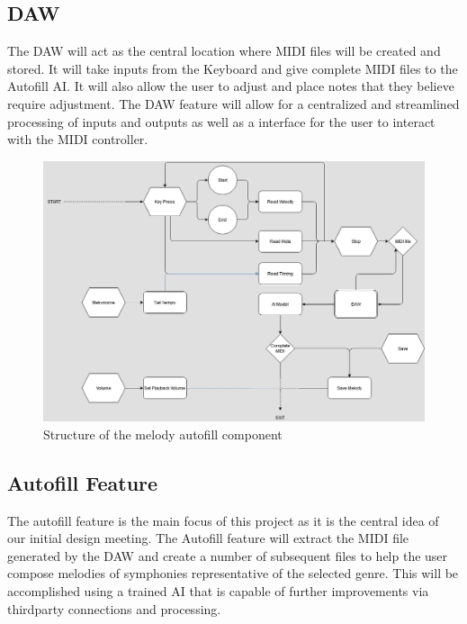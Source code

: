 \subsection{DAW}
The DAW will act as the central location where MIDI files will be created and stored. It
will take inputs from the Keyboard and give complete MIDI files to the Autofill AI. It
will also allow the user to adjust and place notes that they believe require adjustment.
The DAW feature will allow for a centralized and streamlined processing of inputs and
outputs as well as a interface for the user to interact with the MIDI controller.

\begin{figure}[h!]
  \centering
  \includegraphics[width=\linewidth]{image/Autofill.png}
  \caption{Structure of the melody autofill component}
  \label{fig:autofill_diagram}
\end{figure}

\subsection{Autofill Feature}

The autofill feature is the main focus of this project as it is the central idea of our
initial design meeting. The Autofill feature will extract the MIDI file generated by the
DAW and create a number of subsequent files to help the user compose melodies of
symphonies representative of the selected genre. This will be accomplished using a trained
AI that is capable of further improvements via thirdparty connections and processing. 

